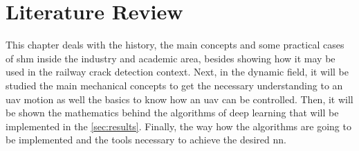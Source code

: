 \chapter{Literature Review}\label{sec:literature_review}

This chapter deals with the history, the main concepts and some practical cases of \gls*{shm} inside the industry and academic area, besides showing how it may be used in the railway crack detection context.
Next, in the dynamic field, it will be studied the main mechanical concepts to get the necessary understanding to an \gls*{uav} motion as well the basics to know how an \gls*{uav} can be controlled.
Then, it will be shown the mathematics behind the algorithms of deep learning that will be implemented in the \cref{sec:results}. 
Finally, the way how the algorithms are going to be implemented and the tools necessary to achieve the desired \gls*{nn}.